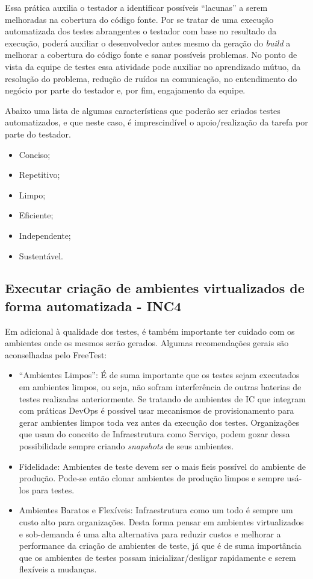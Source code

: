Essa prática auxilia o testador a identificar possíveis “lacunas” a serem melhoradas na cobertura do código fonte. Por se tratar de uma execução automatizada dos testes abrangentes o testador com base no resultado da execução, poderá auxiliar o desenvolvedor antes mesmo da geração do \textit{build} a melhorar a cobertura do código fonte e sanar possíveis problemas. No ponto de vista da equipe de testes essa atividade pode auxiliar no aprendizado mútuo, da resolução do problema, redução de ruídos na comunicação, no entendimento do negócio por parte do testador e, por fim, engajamento da equipe.

Abaixo uma lista de algumas características que poderão ser criados testes automatizados, e que neste caso, é imprescindível o apoio/realização da tarefa por parte do testador.

\begin{itemize}
    \item Conciso;
    \item Repetitivo;
    \item Limpo;
    \item Eficiente;
    \item Independente;
    \item Sustentável.
\end{itemize}

\subsection{Executar criação de ambientes virtualizados de forma automatizada - INC4}
\label{sec:guiainc4}

Em adicional à qualidade dos testes, é também importante ter cuidado com os ambientes onde os mesmos serão gerados. Algumas recomendações gerais são aconselhadas pelo FreeTest:

\begin{itemize}
	\item “Ambientes Limpos”: É de suma importante que os testes sejam executados em ambientes limpos, ou seja, não sofram interferência de outras baterias de testes realizadas anteriormente. Se tratando de ambientes de IC que integram com práticas DevOps é possível usar mecanismos de provisionamento para gerar ambientes limpos toda vez antes da execução dos testes. Organizações que usam do conceito de Infraestrutura como Serviço, podem gozar dessa possibilidade sempre criando \textit{snapshots} de seus ambientes.
	\item Fidelidade: Ambientes de teste devem ser o mais fieis possível do ambiente de produção. Pode-se então clonar ambientes de produção limpos e sempre usá-los para testes.
	\item Ambientes Baratos e Flexíveis: Infraestrutura como um todo é sempre um custo alto para organizações. Desta forma pensar em ambientes virtualizados e sob-demanda é uma alta alternativa para reduzir custos e melhorar a performance da criação de ambientes de teste, já que é de suma importância que os ambientes de testes possam inicializar/desligar rapidamente e serem flexíveis a mudanças.
\end{itemize}

